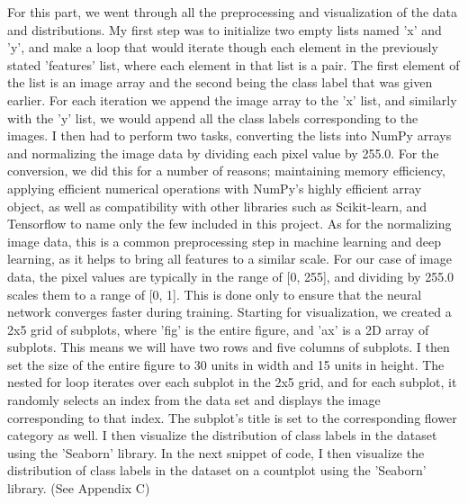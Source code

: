 \documentclass[paper=a4, fontsize=11pt,twoside]{scrartcl}
\begin{document}
For this part, we went through all the preprocessing and visualization of the data and distributions. My first step was to initialize two empty lists named 'x' and 'y', and make a loop that would iterate though each element in the previously stated 'features' list, where each element in that list is a pair. The first element of the list is an image array and the second being the class label that was given earlier. For each iteration we append the image array to the 'x' list, and similarly with the 'y' list, we would append all the class labels corresponding to the images. I then had to perform two tasks, converting the lists into NumPy arrays and normalizing the image data by dividing each pixel value by 255.0. For the conversion, we did this for a number of reasons; maintaining memory efficiency, applying efficient numerical operations with NumPy's highly efficient array object, as well as compatibility with other libraries such as Scikit-learn, and Tensorflow to name only the few included in this project. As for the normalizing image data, this is a common preprocessing step in machine learning and deep learning, as it helps to bring all features to a similar scale. For our case of image data, the pixel values are typically in the range of [0, 255], and dividing by 255.0 scales them to a range of [0, 1]. This is done only to ensure that the neural network converges faster during training. Starting for visualization, we created a 2x5 grid of subplots, where 'fig' is the entire figure, and 'ax' is a 2D array of subplots. This means we will have two rows and five columns of subplots. I then set the size of the entire figure to 30 units in width and 15 units in height. The nested for loop iterates over each subplot in the 2x5 grid, and for each subplot, it randomly selects an index from the data set and displays the image corresponding to that index. The subplot's title is set to the corresponding flower category as well. I then visualize the distribution of class labels in the dataset using the 'Seaborn' library. In the next snippet of code, I then visualize the distribution of class labels in the dataset on a countplot using the 'Seaborn' library.  (See Appendix C) \\
\end{document}
